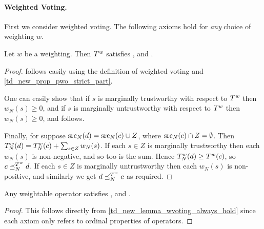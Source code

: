 \begin{table}
\begin{tabular}{lccccc}
        \bottomrule

	\end{tabular}
    \label{td_new_tab_axiom_satisfaction}
\end{table}

\paragraph{Weighted Voting.}

First we consider weighted voting. The following axioms hold for \emph{any}
choice of weighting $w$.

\begin{lemma}
    \label{td_new_lemma_wvoting_always_hold}
    Let $w$ be a weighting. Then $T^{w}$ satisfies \claimcoherence{},
    \marginaltrustworthiness{} and \trustbasedmon{}.
\end{lemma}

\begin{proof}
    \claimcoherence{} follows easily using the definition of weighted
    voting and \cref{td_new_prop_pwo_strict_part}.

    One can easily show that if $s$ is marginally trustworthy with respect to
    $T^{w}$ then $w_N(s) \ge 0$, and if $s$ is marginally untrustworthy
    with respect to $T^{w}$ then $w_N(s) \ge 0$, and
    \marginaltrustworthiness{} follows.

    Finally, for \trustbasedmon{} suppose $\operatorname{src}_N(d) = \operatorname{src}_N(c) \cup Z$, where
    $\operatorname{src}_N(c) \cap Z = \emptyset$. Then $T^{w}_N(d) = T^{w}_N(c) +
    \sum_{s \in Z}{w_N(s)}$. If each $s \in Z$ is marginally trustworthy then
    each $w_N(s)$ is non-negative, and so too is the sum. Hence
    $T^{w}_N(d) \ge T^{w}(c)$, so $c \preceq_N^{T^{w}} d$. If
    each $s \in Z$ is marginally untrustworthy then each $w_N(s)$ is
    non-positive, and similarly we get $d \preceq_N^{T^{w}} c$ as required.
\end{proof}

\begin{corollary}
    \label{td_new_cor_weightable_axioms}
    Any weightable operator satisfies \claimcoherence{},
    \marginaltrustworthiness{} and \trustbasedmon{}.
\end{corollary}

\begin{proof}
    This follows directly from \cref{td_new_lemma_wvoting_always_hold} since
    each axiom only refers to ordinal properties of operators.
\end{proof}


